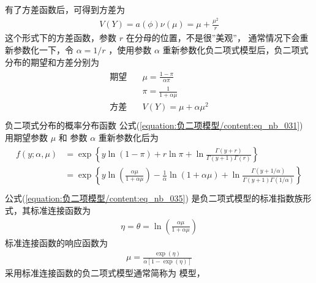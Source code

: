 \documentclass[letterpaper,10pt,english]{sphinxmanual}
\begin{document}
有了方差函数后，可得到方差为
\begin{equation}\label{equation:负二项模型/content:负二项模型/content:3}
\begin{split}V(Y) = a(\phi)\nu(\mu) = \mu + \frac{\mu^2}{r}\end{split}
\end{equation}
这个形式下的方差函数，参数 \(r\) 在分母的位置，不是很”美观”，
通常情况下会重新参数化一下，令 \(\alpha=1/r\)
，使用参数 \(\alpha\) 重新参数化负二项式模型后，负二项式分布的期望和方差分别为
\begin{align}\label{equation:负二项模型/content:负二项模型/content:4}\!\begin{aligned}
\text{期望} & \quad \mu = \frac{1-\pi}{\alpha \pi}\\
& \quad \pi = \frac{1}{1+\alpha \mu}\\
\text{方差} & \quad V(Y) = \mu + \alpha \mu^2\\
\end{aligned}\end{align}
负二项式分布的概率分布函数 公式(\ref{equation:负二项模型/content:eq_nb_031}) 用期望参数 \(\mu\) 和 参数 \(\alpha\)
重新参数化后为
\begin{align}\label{equation:负二项模型/content:eq_nb_035}\!\begin{aligned}
f(y;\alpha,\mu)  &= \exp \left \{
y \ln (1-\pi) + r\ln \pi + \ln \frac{\Gamma(y+r)  }{\Gamma(y+1) \Gamma(r) }
\right \}\\
&= \exp \left \{
y \ln \left (\frac{\alpha \mu}{1+\alpha \mu} \right )- \frac{1}{\alpha} \ln (1+\alpha \mu) + \ln \frac{\Gamma(y+1/\alpha)  }{\Gamma(y+1) \Gamma(1/\alpha) }
\right \}\\
\end{aligned}\end{align}
公式(\ref{equation:负二项模型/content:eq_nb_035}) 是负二项式模型的标准指数族形式，其标准连接函数为
\begin{equation}\label{equation:负二项模型/content:负二项模型/content:5}
\begin{split}\eta = \theta = \ln \left (\frac{\alpha \mu}{1+\alpha \mu} \right )\end{split}
\end{equation}
标准连接函数的响应函数为
\begin{equation}\label{equation:负二项模型/content:负二项模型/content:6}
\begin{split}\mu = \frac{\exp(\eta)}{\alpha[1-\exp(\eta)] }\end{split}
\end{equation}
采用标准连接函数的负二项式模型通常简称为  模型，
\end{document}
